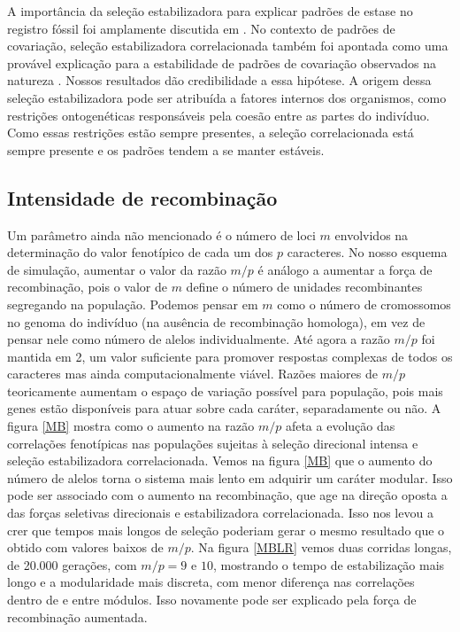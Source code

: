 A importância da seleção estabilizadora para explicar padrões de estase
no registro fóssil foi amplamente discutida em \cite{Charlesworth1982a}.
No contexto de padrões de covariação, seleção estabilizadora
correlacionada também foi apontada como uma provável explicação para a
estabilidade de padrões de covariação observados na natureza
\citep{Cheverud1984, Marroig2001, Porto2009}.
Nossos resultados dão credibilidade a essa hipótese.
A origem dessa seleção estabilizadora pode ser atribuída a fatores
internos dos organismos, como restrições ontogenéticas responsáveis pela
coesão entre as partes do indivíduo.
Como essas restrições estão sempre presentes, a seleção correlacionada
está sempre presente e os padrões tendem a se manter estáveis.

\subsection{Intensidade de recombinação}

Um parâmetro ainda não mencionado é o número de loci $m$ envolvidos na
determinação do valor fenotípico de cada um dos $p$ caracteres.
No nosso esquema de simulação, aumentar o valor da razão $m/p$ é análogo
a aumentar a força de recombinação, pois o valor de $m$ define o número
de unidades recombinantes segregando na população.
Podemos pensar em $m$ como o número de cromossomos no genoma do
indivíduo (na ausência de recombinação homologa), em vez de pensar nele
como número de alelos individualmente.  Até agora a razão $m/p$ foi
mantida em 2, um valor suficiente para promover respostas complexas de
todos os caracteres mas ainda computacionalmente viável.
Razões maiores de $m/p$ teoricamente aumentam o espaço de variação
possível para população, pois mais genes estão disponíveis para atuar
sobre cada caráter, separadamente ou não.
A figura \ref{MB} mostra como o aumento na razão $m/p$ afeta a evolução
das correlações fenotípicas nas populações sujeitas à seleção direcional
intensa e seleção estabilizadora correlacionada.
Vemos na figura \ref{MB} que o aumento do número de alelos torna o
sistema mais lento em adquirir um caráter modular.
Isso pode ser associado com o aumento na recombinação, que age na
direção oposta a das forças seletivas direcionais e estabilizadora
correlacionada.
Isso nos levou a crer que tempos mais longos de seleção poderiam gerar o
mesmo resultado que o obtido com valores baixos de $m/p$.
Na figura \ref{MBLR} vemos duas corridas longas, de 20.000 gerações, com
$m/p = 9$ e $10$, mostrando o tempo de estabilização mais longo e a
modularidade mais discreta, com menor diferença nas correlações dentro
de e entre módulos.
Isso novamente pode ser explicado pela força de recombinação aumentada.

